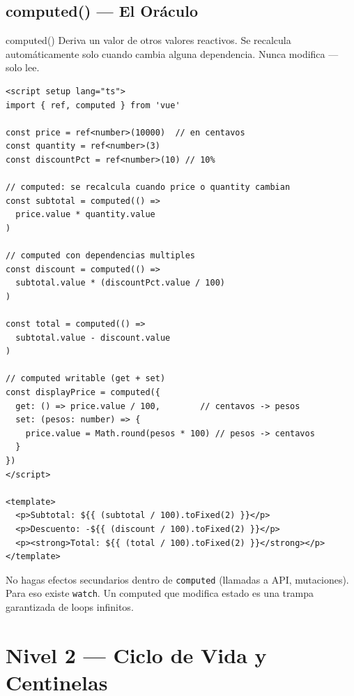 \documentclass[11pt,a4paper]{article}
\begin{document}
\subsection{computed() — El Oráculo}

\begin{hechizo}{computed()}
Deriva un valor de otros valores reactivos. Se recalcula
automáticamente solo cuando cambia alguna dependencia. Nunca
modifica --- solo lee.
\end{hechizo}

\begin{pergamino}
\begin{lstlisting}[style=vue]
<script setup lang="ts">
import { ref, computed } from 'vue'

const price = ref<number>(10000)  // en centavos
const quantity = ref<number>(3)
const discountPct = ref<number>(10) // 10%

// computed: se recalcula cuando price o quantity cambian
const subtotal = computed(() =>
  price.value * quantity.value
)

// computed con dependencias multiples
const discount = computed(() =>
  subtotal.value * (discountPct.value / 100)
)

const total = computed(() =>
  subtotal.value - discount.value
)

// computed writable (get + set)
const displayPrice = computed({
  get: () => price.value / 100,        // centavos -> pesos
  set: (pesos: number) => {
    price.value = Math.round(pesos * 100) // pesos -> centavos
  }
})
</script>

<template>
  <p>Subtotal: ${{ (subtotal / 100).toFixed(2) }}</p>
  <p>Descuento: -${{ (discount / 100).toFixed(2) }}</p>
  <p><strong>Total: ${{ (total / 100).toFixed(2) }}</strong></p>
</template>
\end{lstlisting}
\end{pergamino}

\begin{trampa}
No hagas efectos secundarios dentro de \texttt{computed} (llamadas a API,
mutaciones). Para eso existe \texttt{watch}. Un computed que modifica
estado es una trampa garantizada de loops infinitos.
\end{trampa}

\section{Nivel 2 — Ciclo de Vida y Centinelas}
\end{document}
